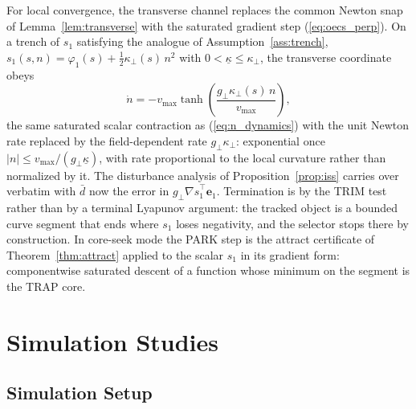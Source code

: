 \documentclass[lettersize,journal]{IEEEtran}
\begin{document}
For local convergence, the transverse channel replaces the common
Newton snap of Lemma~\ref{lem:transverse} with the saturated gradient
step (\ref{eq:oecs_perp}). On a trench of $s_1$ satisfying the analogue
of Assumption~\ref{ass:trench}, $s_1(s, n) = \varphi_1(s) +
\tfrac{1}{2}\kappa_\perp(s)\,n^2$ with $0 < \underline{\kappa} \leq
\kappa_\perp$, the transverse coordinate obeys
\begin{equation}
    \dot{n} = -v_{\max}\tanh\!\left(
    \frac{g_\perp \kappa_\perp(s)\,n}{v_{\max}}\right),
    \label{eq:oecs_n_dynamics}
\end{equation}
the same saturated scalar contraction as (\ref{eq:n_dynamics}) with the
unit Newton rate replaced by the field-dependent rate $g_\perp
\kappa_\perp$: exponential once $|n| \leq v_{\max}/(g_\perp
\underline{\kappa})$, with rate proportional to the local curvature
rather than normalized by it. The disturbance analysis of
Proposition~\ref{prop:iss} carries over verbatim with $\bar{d}$ now the
error in $g_\perp \nabla\hat{s}_1^\top\mathbf{e}_1$. Termination is by
the TRIM test rather than by a terminal Lyapunov argument: the tracked
object is a bounded curve segment that ends where $s_1$ loses
negativity, and the selector stops there by construction. In core-seek
mode the PARK step is the attract certificate of
Theorem~\ref{thm:attract} applied to the scalar $s_1$ in its gradient
form: componentwise saturated descent of a function whose minimum on
the segment is the TRAP core.


\section{Simulation Studies}
\label{sec:methods}
\label{sec:results}

\subsection{Simulation Setup}
\end{document}
